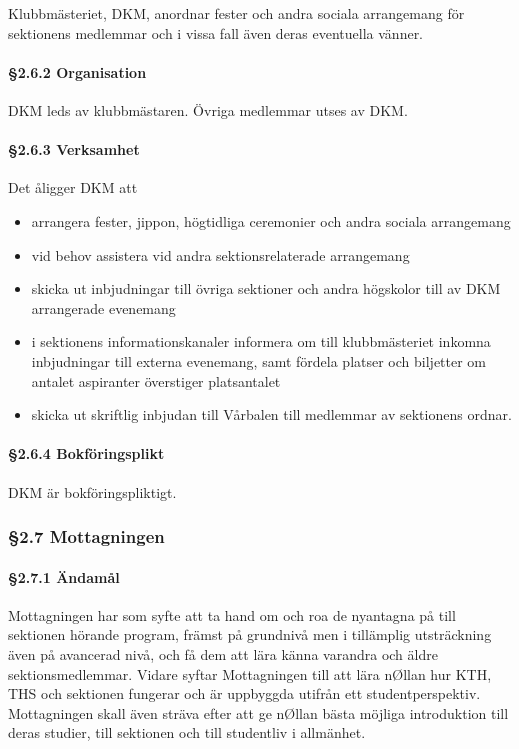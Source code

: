 Klubbmästeriet, DKM, anordnar fester och andra sociala arrangemang för sektionens medlemmar och i vissa fall även deras eventuella vänner.

\paragraph{§2.6.2 Organisation}

DKM leds av klubbmästaren. Övriga medlemmar utses av DKM.

\paragraph{§2.6.3 Verksamhet}

Det åligger DKM att

\begin{itemize}
  \item arrangera fester, jippon, högtidliga ceremonier och andra sociala arrangemang
  \item vid behov assistera vid andra sektionsrelaterade arrangemang
  \item skicka ut inbjudningar till övriga sektioner och andra högskolor till av DKM arrangerade evenemang
  \item i sektionens informationskanaler informera om till klubbmästeriet inkomna inbjudningar till externa evenemang, samt fördela platser och biljetter om antalet aspiranter överstiger platsantalet
  \item skicka ut skriftlig inbjudan till Vårbalen till medlemmar av sektionens ordnar.
\end{itemize}

\paragraph{§2.6.4 Bokföringsplikt}

DKM är bokföringspliktigt.

\subsubsection{§2.7 Mottagningen}

\paragraph{§2.7.1 Ändamål}

Mottagningen har som syfte att ta hand om och roa de nyantagna på till sektionen hörande program, främst på grundnivå men i tillämplig utsträckning även på avancerad nivå, och få dem att lära känna varandra och äldre sektionsmedlemmar. Vidare syftar Mottagningen till att lära nØllan hur KTH, THS och sektionen fungerar och är uppbyggda utifrån ett studentperspektiv. Mottagningen skall även sträva efter att ge nØllan bästa möjliga introduktion till deras studier, till sektionen och till studentliv i allmänhet.

